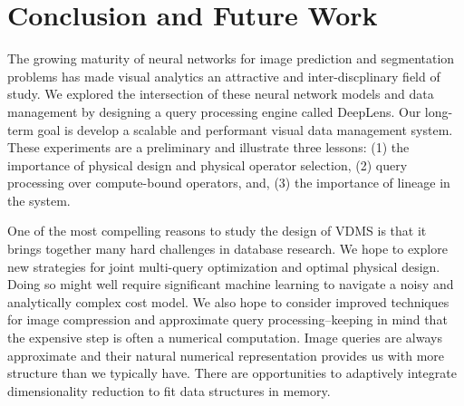 \section{Conclusion and Future Work}
The growing maturity of neural networks for image prediction and segmentation problems has made visual analytics an attractive and inter-discplinary field of study.
We explored the intersection of these neural network models and data management by designing a query processing engine called \textsf{DeepLens}.
Our long-term goal is develop a scalable and performant visual data management system.
These experiments are a preliminary and  illustrate three lessons: (1) the importance of physical design and physical operator selection, (2) query processing over compute-bound operators, and, (3) the importance of lineage in the system. 

One of the most compelling reasons to study the design of VDMS is that it brings together many hard challenges in database research. 
We hope to explore new strategies for joint multi-query optimization and optimal physical design. Doing so might well require significant machine learning to navigate a noisy and analytically complex cost model. 
We also hope to consider improved techniques for image compression and approximate query processing--keeping in mind that the expensive step is often a numerical computation.
Image queries are always approximate and their natural numerical representation provides us with more structure than we typically have.
There are opportunities to adaptively integrate dimensionality reduction to fit data structures in memory.
